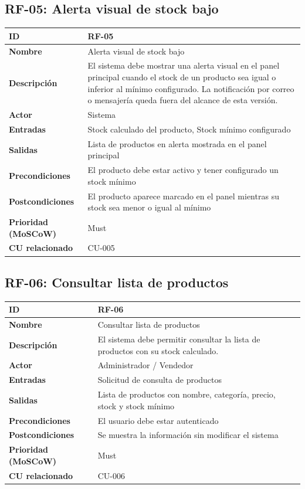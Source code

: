 \documentclass[12pt, a4paper]{article}
\begin{document}
\subsection{RF-05: Alerta visual de stock bajo}
\begin{center}
\renewcommand{\arraystretch}{1.4}
\begin{tabular}{|L{4cm}|L{12cm}|}
\hline
\textbf{ID} & RF-05 \\
\hline
\textbf{Nombre} & Alerta visual de stock bajo \\
\hline
\textbf{Descripción} & El sistema debe mostrar una alerta visual en el panel principal cuando el stock de un producto sea igual o inferior al mínimo configurado. La notificación por correo o mensajería queda fuera del alcance de esta versión. \\
\hline
\textbf{Actor} & Sistema \\
\hline
\textbf{Entradas} & Stock calculado del producto, Stock mínimo configurado \\
\hline
\textbf{Salidas} & Lista de productos en alerta mostrada en el panel principal \\
\hline
\textbf{Precondiciones} & El producto debe estar activo y tener configurado un stock mínimo \\
\hline
\textbf{Postcondiciones} & El producto aparece marcado en el panel mientras su stock sea menor o igual al mínimo \\
\hline
\textbf{Prioridad (MoSCoW)} & Must \\
\hline
\textbf{CU relacionado} & CU-005 \\
\hline
\end{tabular}
\end{center}

\subsection{RF-06: Consultar lista de productos}
\begin{center}
\renewcommand{\arraystretch}{1.4}
\begin{tabular}{|L{4cm}|L{12cm}|}
\hline
\textbf{ID} & RF-06 \\
\hline
\textbf{Nombre} & Consultar lista de productos \\
\hline
\textbf{Descripción} & El sistema debe permitir consultar la lista de productos con su stock calculado. \\
\hline
\textbf{Actor} & Administrador / Vendedor \\
\hline
\textbf{Entradas} & Solicitud de consulta de productos \\
\hline
\textbf{Salidas} & Lista de productos con nombre, categoría, precio, stock y stock mínimo \\
\hline
\textbf{Precondiciones} & El usuario debe estar autenticado \\
\hline
\textbf{Postcondiciones} & Se muestra la información sin modificar el sistema \\
\hline
\textbf{Prioridad (MoSCoW)} & Must \\
\hline
\textbf{CU relacionado} & CU-006 \\
\hline
\end{tabular}
\end{center}
\end{document}
